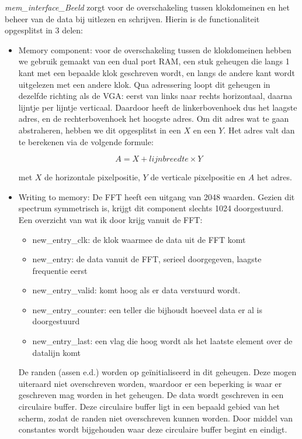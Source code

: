 \documentclass[a4paper,kul]{kulakarticle} %
\begin{document}
\textit{mem\_interface\_Beeld} zorgt voor de overschakeling tussen klokdomeinen en het beheer van de data bij uitlezen en schrijven. Hierin is de functionaliteit opgesplitst in 3 delen:
\begin{itemize}
	\item Memory component: voor de overschakeling tussen de klokdomeinen hebben we gebruik gemaakt van een dual port RAM, een stuk geheugen die langs 1 kant met een bepaalde klok geschreven wordt, en langs de andere kant wordt uitgelezen met een andere klok. Qua adressering loopt dit geheugen in dezelfde richting als de VGA: eerst van links naar rechts horizontaal, daarna lijntje per lijntje verticaal. Daardoor heeft de linkerbovenhoek dus het laagste adres, en de rechterbovenhoek het hoogste adres. Om dit adres wat te gaan abstraheren, hebben we dit opgesplitst in een $X$ en een $Y$. Het adres valt dan te berekenen via de volgende formule:
	
	$$ A = X + lijnbreedte \times Y $$
	
	met $X$ de horizontale pixelpositie, $Y$ de verticale pixelpositie en $A$ het adres.
	
	\item Writing to memory: De FFT heeft een uitgang van 2048 waarden. Gezien dit spectrum symmetrisch is, krijgt dit component slechts 1024 doorgestuurd. Een overzicht van wat ik door krijg vanuit de FFT:
	\begin{itemize}
		\item new\_entry\_clk: de klok waarmee de data uit de FFT komt
		\item new\_entry: de data vanuit de FFT, serieel doorgegeven, laagste frequentie eerst
		\item new\_entry\_valid: komt hoog als er data verstuurd wordt.
		\item new\_entry\_counter: een teller die bijhoudt hoeveel data er al is doorgestuurd
		\item new\_entry\_last: een vlag die hoog wordt als het laatste element over de datalijn komt
	\end{itemize}
	De randen (assen e.d.) worden op geïnitialiseerd in dit geheugen. Deze mogen uiteraard niet overschreven worden, waardoor er een beperking is waar er geschreven mag worden in het geheugen. De data wordt geschreven in een circulaire buffer. Deze circulaire buffer ligt in een bepaald gebied van het scherm, zodat de randen niet overschreven kunnen worden. Door middel van constantes wordt bijgehouden waar deze circulaire buffer begint en eindigt. \\
	

\end{itemize}
\end{document}
